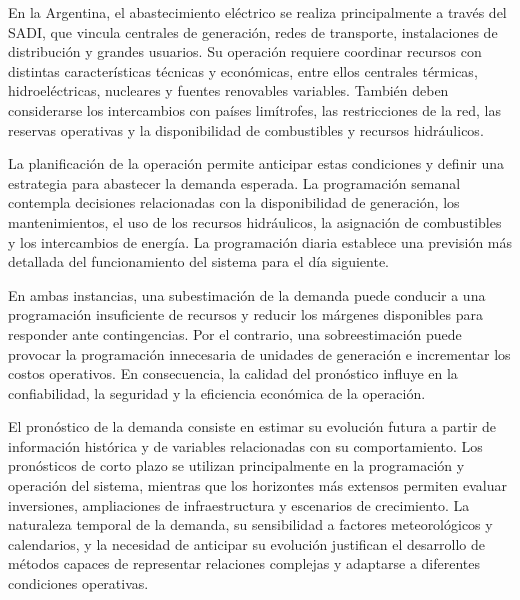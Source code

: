En la Argentina, el abastecimiento eléctrico se realiza principalmente a través del SADI, que vincula centrales de generación, redes de transporte, instalaciones de distribución y grandes usuarios. Su operación requiere coordinar recursos con distintas características técnicas y económicas, entre ellos centrales térmicas, hidroeléctricas, nucleares y fuentes renovables variables. También deben considerarse los intercambios con países limítrofes, las restricciones de la red, las reservas operativas y la disponibilidad de combustibles y recursos hidráulicos.

La planificación de la operación permite anticipar estas condiciones y definir una estrategia para abastecer la demanda esperada. La programación semanal contempla decisiones relacionadas con la disponibilidad de generación, los mantenimientos, el uso de los recursos hidráulicos, la asignación de combustibles y los intercambios de energía. La programación diaria establece una previsión más detallada del funcionamiento del sistema para el día siguiente.

En ambas instancias, una subestimación de la demanda puede conducir a una programación insuficiente de recursos y reducir los márgenes disponibles para responder ante contingencias. Por el contrario, una sobreestimación puede provocar la programación innecesaria de unidades de generación e incrementar los costos operativos. En consecuencia, la calidad del pronóstico influye en la confiabilidad, la seguridad y la eficiencia económica de la operación.

El pronóstico de la demanda consiste en estimar su evolución futura a partir de información histórica y de variables relacionadas con su comportamiento. Los pronósticos de corto plazo se utilizan principalmente en la programación y operación del sistema, mientras que los horizontes más extensos permiten evaluar inversiones, ampliaciones de infraestructura y escenarios de crecimiento. La naturaleza temporal de la demanda, su sensibilidad a factores meteorológicos y calendarios, y la necesidad de anticipar su evolución justifican el desarrollo de métodos capaces de representar relaciones complejas y adaptarse a diferentes condiciones operativas.



